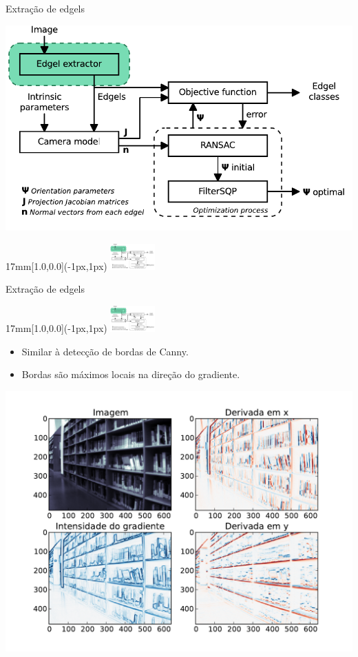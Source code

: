 \begin{frame}{Extração de edgels}
  \centerline{\includegraphics[height=12\baselineskip]{blocos_s1.pdf}}
  \begin{textblock*}{17mm}[1.0,0.0](\paperwidth-1px,1px)%
    \includegraphics[width=17mm]{blocos_s1.png}%
  \end{textblock*}%
\end{frame}
\addtocounter{framenumber}{-1}

\begin{frame}{Extração de edgels}
  \begin{textblock*}{17mm}[1.0,0.0](\paperwidth-1px,1px)
    \includegraphics[width=17mm]{blocos_s1.png}
  \end{textblock*}
  \begin{itemize}
  \item Similar à detecção de bordas de Canny.\\
  \item Bordas são máximos locais na direção do gradiente.
  \end{itemize}
  \centerline{\includegraphics[height=12\baselineskip]{graddemo2.pdf}}
\end{frame}


